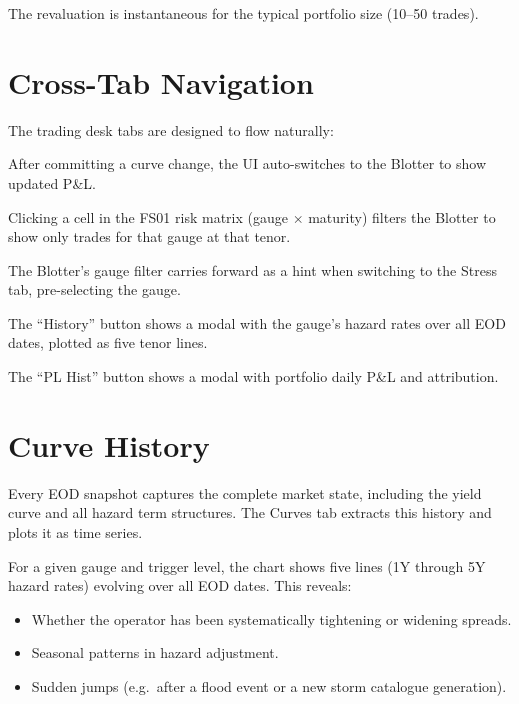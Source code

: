 \documentclass[11pt,a4paper]{article}
\begin{document}
\noindent The revaluation is instantaneous for the typical portfolio
size (10--50 trades).


\section{Cross-Tab Navigation}

The trading desk tabs are designed to flow naturally:

\begin{description}[leftmargin=2em]
  \item[Market $\to$ Blotter] After committing a curve change, the UI
        auto-switches to the Blotter to show updated P\&L.
  \item[FS01 $\to$ Blotter] Clicking a cell in the FS01 risk matrix
        (gauge $\times$ maturity) filters the Blotter to show only
        trades for that gauge at that tenor.
  \item[Blotter $\to$ Stress] The Blotter's gauge filter carries
        forward as a hint when switching to the Stress tab, pre-selecting
        the gauge.
  \item[Market $\to$ History] The ``History'' button shows a modal
        with the gauge's hazard rates over all EOD dates, plotted as
        five tenor lines.
  \item[Market $\to$ P\&L History] The ``PL Hist'' button shows a
        modal with portfolio daily P\&L and attribution.
\end{description}


\section{Curve History}

Every EOD snapshot captures the complete market state, including the
yield curve and all hazard term structures.  The Curves tab extracts
this history and plots it as time series.

For a given gauge and trigger level, the chart shows five lines
(1Y through 5Y hazard rates) evolving over all EOD dates.  This
reveals:
\begin{itemize}
  \item Whether the operator has been systematically tightening or
        widening spreads.
  \item Seasonal patterns in hazard adjustment.
  \item Sudden jumps (e.g.\ after a flood event or a new storm
        catalogue generation).
\end{itemize}
\end{document}
